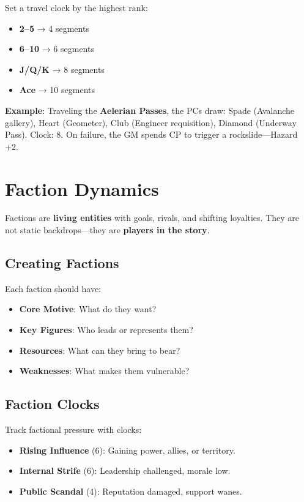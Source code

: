 Set a travel clock by the highest rank:
\begin{itemize}
    \item \textbf{2–5} → 4 segments
    \item \textbf{6–10} → 6 segments
    \item \textbf{J/Q/K} → 8 segments
    \item \textbf{Ace} → 10 segments
\end{itemize}

\textbf{Example}: Traveling the \textbf{Aelerian Passes}, the PCs draw: Spade (Avalanche gallery), Heart (Geometer), Club (Engineer requisition), Diamond (Underway Pass). Clock: 8. On failure, the GM spends CP to trigger a rockslide—Hazard +2.

\section*{Faction Dynamics}

Factions are \textbf{living entities} with goals, rivals, and shifting loyalties. They are not static backdrops—they are \textbf{players in the story}.

\subsection*{Creating Factions}

Each faction should have:

\begin{itemize}
    \item \textbf{Core Motive}: What do they want?
    \item \textbf{Key Figures}: Who leads or represents them?
    \item \textbf{Resources}: What can they bring to bear?
    \item \textbf{Weaknesses}: What makes them vulnerable?
\end{itemize}

\subsection*{Faction Clocks}

Track factional pressure with clocks:

\begin{itemize}
    \item \textbf{Rising Influence} (6): Gaining power, allies, or territory.
    \item \textbf{Internal Strife} (6): Leadership challenged, morale low.
    \item \textbf{Public Scandal} (4): Reputation damaged, support wanes.
\end{itemize}


